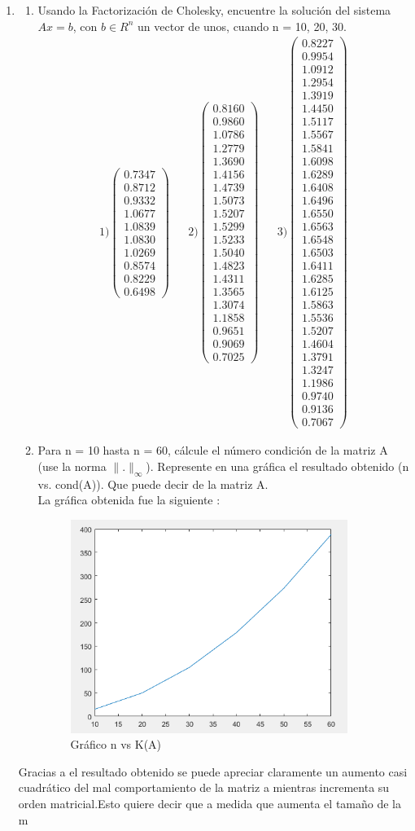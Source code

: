 \documentclass{udpreport}
\providecommand{\norm}[1]{\lVert#1\rVert}
\begin{document}
\begin{enumerate}
 	
 	\item 
 	 \begin{enumerate}
 	    \item Usando la Factorización de Cholesky, encuentre la solución del sistema $Ax = b$, con $b \in R^{n}$  un vector de unos, cuando n = 10, 20, 30.
 	        \begin{align*}
 	             1) \left(\begin{array}{c} 0.7347\\ 0.8712\\ 0.9332\\ 1.0677\\ 1.0839\\ 1.0830\\ 1.0269\\ 0.8574\\ 0.8229\\ 0.6498 \end{array}\right) 	 &&   2) \left(\begin{array}{c} 0.8160\\ 0.9860\\ 1.0786\\ 1.2779\\ 1.3690\\ 1.4156\\ 1.4739\\ 1.5073\\ 1.5207\\ 1.5299\\ 1.5233\\ 1.5040\\ 1.4823\\ 1.4311\\ 1.3565\\ 1.3074\\ 1.1858\\ 0.9651\\ 0.9069\\ 0.7025 \end{array}\right)   &&  3) \left(\begin{array}{c} 0.8227\\ 0.9954\\ 1.0912\\ 1.2954\\ 1.3919\\ 1.4450\\ 1.5117\\ 1.5567\\ 1.5841\\ 1.6098\\ 1.6289\\ 1.6408\\ 1.6496\\ 1.6550\\ 1.6563\\ 1.6548\\ 1.6503\\ 1.6411\\ 1.6285\\ 1.6125\\ 1.5863\\ 1.5536\\ 1.5207\\ 1.4604\\ 1.3791\\ 1.3247\\ 1.1986\\ 0.9740\\ 0.9136\\ 0.7067 \end{array}\right) 
 	        \end{align*}
	        
 	        \item Para n = 10 hasta n = 60, cálcule el número condición de la matriz A (use la norma $\norm{.}_{\infty}$). Represente en una gráfica el resultado obtenido (n vs. cond(A)). Que puede decir de la matriz A.\\
 	        
 	        La gráfica obtenida fue la siguiente :
            \begin{figure}[H]
                \centering
                \includegraphics[width=9cm]{Grafico2b}
                \caption{Gráfico n vs K(A)} \label{fig:Grafico2b}
            \end{figure}
       \end{enumerate}     
            Gracias a el resultado obtenido se puede apreciar claramente un aumento casi cuadrático del mal comportamiento de la matriz a mientras incrementa su orden matricial.Esto quiere decir que a medida que aumenta el tamaño de la m
\end{enumerate}
\end{document}
